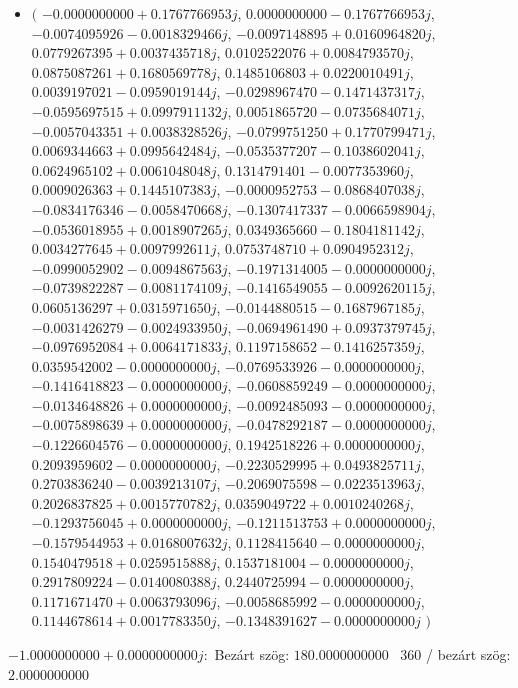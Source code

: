 \documentclass[14pt,a4paper]{article}
\begin{document}
\begin{itemize}
\item
$\big($
$-0.0000000000+0.1767766953j$, $0.0000000000-0.1767766953j$, $-0.0074095926-0.0018329466j$, $-0.0097148895+0.0160964820j$, $0.0779267395+0.0037435718j$, $0.0102522076+0.0084793570j$, $0.0875087261+0.1680569778j$, $0.1485106803+0.0220010491j$, $0.0039197021-0.0959019144j$, $-0.0298967470-0.1471437317j$, $-0.0595697515+0.0997911132j$, $0.0051865720-0.0735684071j$, $-0.0057043351+0.0038328526j$, $-0.0799751250+0.1770799471j$, $0.0069344663+0.0995642484j$, $-0.0535377207-0.1038602041j$, $0.0624965102+0.0061048048j$, $0.1314791401-0.0077353960j$, $0.0009026363+0.1445107383j$, $-0.0000952753-0.0868407038j$, $-0.0834176346-0.0058470668j$, $-0.1307417337-0.0066598904j$, $-0.0536018955+0.0018907265j$, $0.0349365660-0.1804181142j$, $0.0034277645+0.0097992611j$, $0.0753748710+0.0904952312j$, $-0.0990052902-0.0094867563j$, $-0.1971314005-0.0000000000j$, $-0.0739822287-0.0081174109j$, $-0.1416549055-0.0092620115j$, $0.0605136297+0.0315971650j$, $-0.0144880515-0.1687967185j$, $-0.0031426279-0.0024933950j$, $-0.0694961490+0.0937379745j$, $-0.0976952084+0.0064171833j$, $0.1197158652-0.1416257359j$, $0.0359542002-0.0000000000j$, $-0.0769533926-0.0000000000j$, $-0.1416418823-0.0000000000j$, $-0.0608859249-0.0000000000j$, $-0.0134648826+0.0000000000j$, $-0.0092485093-0.0000000000j$, $-0.0075898639+0.0000000000j$, $-0.0478292187-0.0000000000j$, $-0.1226604576-0.0000000000j$, $0.1942518226+0.0000000000j$, $0.2093959602-0.0000000000j$, $-0.2230529995+0.0493825711j$, $0.2703836240-0.0039213107j$, $-0.2069075598-0.0223513963j$, $0.2026837825+0.0015770782j$, $0.0359049722+0.0010240268j$, $-0.1293756045+0.0000000000j$, $-0.1211513753+0.0000000000j$, $-0.1579544953+0.0168007632j$, $0.1128415640-0.0000000000j$, $0.1540479518+0.0259515888j$, $0.1537181004-0.0000000000j$, $0.2917809224-0.0140080388j$, $0.2440725994-0.0000000000j$, $0.1171671470+0.0063793096j$, $-0.0058685992-0.0000000000j$, $0.1144678614+0.0017783350j$, $-0.1348391627-0.0000000000j$
$\big)$
\end{itemize}
$-1.0000000000+0.0000000000j$:\
Bezárt szög: $180.0000000000$ \
360 / bezárt szög: $2.0000000000$\
\end{document}

